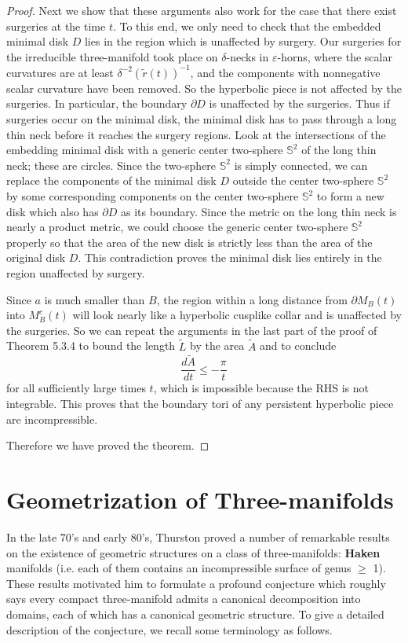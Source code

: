 \begin{proof}
Next we show that these arguments also work for the case that
there exist surgeries at the time $t$. To this end, we only need
to check that the embedded minimal disk $D$ lies in the region
which is unaffected by surgery. Our surgeries for the irreducible
three-manifold took place on $\delta$-necks in
$\varepsilon$-horns, where the scalar curvatures are at least
$\delta^{-2} (\widetilde{r}(t))^{-1}$, and the components with
nonnegative scalar curvature have been removed. So the hyperbolic
piece is not affected by the surgeries. In particular, the
boundary $\partial D$ is unaffected by the surgeries. Thus if
surgeries occur on the minimal disk, the minimal disk has to pass
through a long thin neck before it reaches the surgery regions.
Look at the intersections of the embedding minimal disk with a
generic center two-sphere $\mathbb{S}^2$ of the long thin neck;
these are circles. Since the two-sphere $\mathbb{S}^2$ is simply
connected, we can replace the components of the minimal disk $D$
outside the center two-sphere $\mathbb{S}^2$ by some corresponding
components on the center two-sphere $\mathbb{S}^2$ to form a new
disk which also has $\partial D$ as its boundary. Since the metric
on the long thin neck is nearly a product metric, we could choose
the generic center two-sphere $\mathbb{S}^2$ properly so that the
area of the new disk is strictly less than the area of the
original disk $D$. This contradiction proves the minimal disk lies
entirely in the region unaffected by surgery.

Since $a$ is much smaller than $B$, the region within a long
distance from $\partial M_B(t)$ into $M^c_B(t)$ will look nearly
like a hyperbolic cusplike collar and is unaffected by the
surgeries. So we can repeat the arguments in the last part of the
proof of Theorem 5.3.4 to bound the length $\widetilde{L}$ by the
area $\widetilde{A}$ and to conclude
$$\frac{d\widetilde{A}}{dt}\leq -\frac{\pi}{t}$$ for all
sufficiently large times $t$, which is impossible because the RHS
is not integrable. This proves that the boundary tori of any
persistent hyperbolic piece are incompressible.

Therefore we have proved the theorem.
\end{proof}


\section{Geometrization of Three-manifolds}

In the late 70's and early 80's, Thurston \cite{Th82, Th86, Th88}
proved a number of remarkable results on the existence of
geometric structures on a class of three-manifolds:
\textbf{Haken} manifolds (i.e. each of them contains
an incompressible surface of genus $\geq$ 1). These results
motivated him to formulate a profound conjecture which roughly
says every compact three-manifold admits a canonical decomposition
into domains, each of which has a canonical geometric structure.
To give a detailed description of the conjecture, we recall some
terminology as follows.

